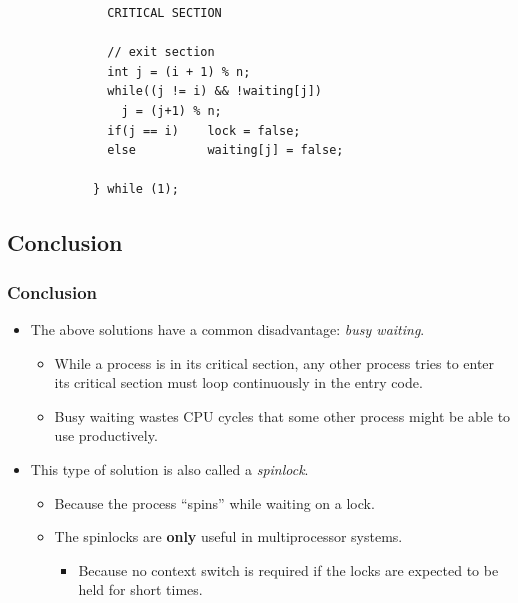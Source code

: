 \documentclass[CJKutf8,xcolor=pdftex,dvipsnames,table]{beamer}
\begin{document}
\begin{CJK*}{UTF8}{song}
\begin{frame}[fragile]
\begin{lstlisting}
              CRITICAL SECTION

              // exit section
              int j = (i + 1) % n;
              while((j != i) && !waiting[j])
                j = (j+1) % n;
              if(j == i)    lock = false;
              else          waiting[j] = false;

            } while (1);
\end{lstlisting}

\end{frame}

\subsection{Conclusion}

  \begin{frame}
  \frametitle{Conclusion} \pause
  \begin{itemize}
  \item{The above solutions have a common disadvantage: \emph{busy waiting}.} \pause
    \begin{itemize}
    \item{While a process is in its critical section, any other process tries to enter its critical section must loop continuously in the entry code.} \pause
    \item{Busy waiting wastes CPU cycles that some other process might be able to use productively.} \pause
    \end{itemize}
  \item{This type of solution is also called a \emph{spinlock}.} \pause
    \begin{itemize}
    \item{Because the process ``spins'' while waiting on a lock.} \pause
    \item{The spinlocks are \textbf{only} useful in multiprocessor systems.} \pause
      \begin{itemize}
      \item{Because no context switch is required if the locks are expected to be held for short times.}
      \end{itemize}
    \end{itemize}
  \end{itemize}
  \end{frame}


\end{CJK*}
\end{document}

